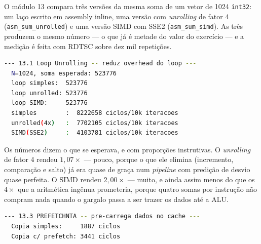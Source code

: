 O módulo 13 compara três versões da mesma soma de um vetor de 1024
\texttt{int32}: um laço escrito em assembly inline, uma versão com
\emph{unrolling} de fator 4 (\texttt{asm\_sum\_unrolled}) e uma versão SIMD com
SSE2 (\texttt{asm\_sum\_simd}). As três produzem o mesmo número --- o que já é
metade do valor do exercício --- e a medição é feita com RDTSC sobre dez mil
repetições.

\begin{lstlisting}[style=bt, language=bash,
    caption={Saída medida de \texttt{dist/bin/asm\_13\_optimization},
             seção 13.1.}]
--- 13.1 Loop Unrolling -- reduz overhead do loop ---
  N=1024, soma esperada: 523776
  loop simples:  523776
  loop unrolled: 523776
  loop SIMD:     523776
  simples        :  8222658 ciclos/10k iteracoes
  unrolled(4x)   :  7702105 ciclos/10k iteracoes
  SIMD(SSE2)     :  4103781 ciclos/10k iteracoes
\end{lstlisting}

Os números dizem o que se esperava, e com proporções instrutivas. O
\emph{unrolling} de fator 4 rendeu $1{,}07\times$ --- pouco, porque o que ele
elimina (incremento, comparação e salto) já era quase de graça num
\emph{pipeline} com predição de desvio quase perfeita. O SIMD rendeu
$2{,}00\times$ --- muito, e ainda assim menos do que os $4\times$ que a
aritmética ingênua prometeria, porque quatro somas por instrução não compram
nada quando o gargalo passa a ser trazer os dados até a ALU.

\begin{lstlisting}[style=bt, language=bash,
    caption={Mesma execução, seção 13.3: a medição que contrariou a
             expectativa.}]
--- 13.3 PREFETCHNTA -- pre-carrega dados no cache ---
  Copia simples:     1887 ciclos
  Copia c/ prefetch: 3441 ciclos
\end{lstlisting}

